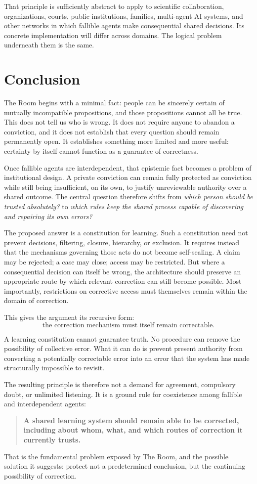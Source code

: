 \documentclass[11pt,a4paper]{article}
\begin{document}
That principle is sufficiently abstract to apply to scientific collaboration, organizations, courts, public institutions, families, multi-agent AI systems, and other networks in which fallible agents make consequential shared decisions. Its concrete implementation will differ across domains. The logical problem underneath them is the same.

\section{Conclusion}

The Room begins with a minimal fact: people can be sincerely certain of mutually incompatible propositions, and those propositions cannot all be true. This does not tell us who is wrong. It does not require anyone to abandon a conviction, and it does not establish that every question should remain permanently open. It establishes something more limited and more useful: certainty by itself cannot function as a guarantee of correctness.

Once fallible agents are interdependent, that epistemic fact becomes a problem of institutional design. A private conviction can remain fully protected as conviction while still being insufficient, on its own, to justify unreviewable authority over a shared outcome. The central question therefore shifts from \emph{which person should be trusted absolutely?} to \emph{which rules keep the shared process capable of discovering and repairing its own errors?}

The proposed answer is a constitution for learning. Such a constitution need not prevent decisions, filtering, closure, hierarchy, or exclusion. It requires instead that the mechanisms governing those acts do not become self-sealing. A claim may be rejected; a case may close; access may be restricted. But where a consequential decision can itself be wrong, the architecture should preserve an appropriate route by which relevant correction can still become possible. Most importantly, restrictions on corrective access must themselves remain within the domain of correction.

This gives the argument its recursive form:
\[
\boxed{\text{the correction mechanism must itself remain correctable}.}
\]

A learning constitution cannot guarantee truth. No procedure can remove the possibility of collective error. What it can do is prevent present authority from converting a potentially correctable error into an error that the system has made structurally impossible to revisit.

The resulting principle is therefore not a demand for agreement, compulsory doubt, or unlimited listening. It is a ground rule for coexistence among fallible and interdependent agents:
\begin{quote}
\textbf{A shared learning system should remain able to be corrected, including about whom, what, and which routes of correction it currently trusts.}
\end{quote}

That is the fundamental problem exposed by The Room, and the possible solution it suggests: protect not a predetermined conclusion, but the continuing possibility of correction.
\end{document}
